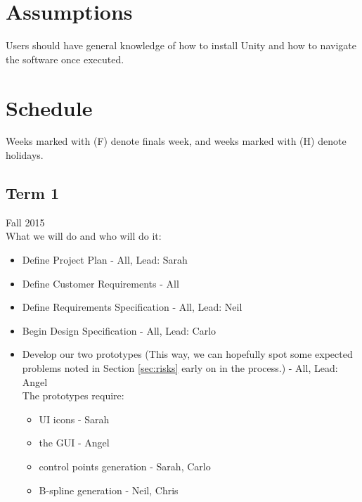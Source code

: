 \documentclass[12pt]{article}
\begin{document}
\section{Assumptions}
\label{sec:assumptions}
Users should have general knowledge of how to install Unity and how to navigate the software once executed.

\section{Schedule}
\label{sec:schedule}
Weeks marked with (F) denote finals week, and weeks marked with (H) denote holidays.

\subsection{Term 1}
Fall 2015 \\
What we will do and who will do it:
\begin{itemize}
	\item Define Project Plan - All, Lead: Sarah
	\item Define Customer Requirements - All
	\item Define Requirements Specification - All, Lead: Neil
	\item Begin Design Specification - All, Lead: Carlo
	\item Develop our two prototypes (This way, we can hopefully spot some expected problems noted in Section \ref{sec:risks} early on in the process.) - All, Lead: Angel \\
	The prototypes require:
	\begin{itemize} 
		\item UI icons - Sarah
		\item the GUI - Angel
		\item control points generation - Sarah, Carlo
		\item B-spline generation - Neil, Chris
	\end{itemize}
\end{itemize}
\end{document}

